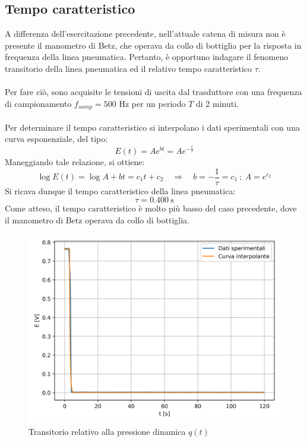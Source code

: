 \newpage
\subsection{Tempo caratteristico}
A differenza dell'esercitazione precedente, nell'attuale catena di misura non è presente il manometro di Betz, che operava da collo di bottiglia per la risposta in frequenza della linea pneumatica. Pertanto, è opportuno indagare il fenomeno transitorio della linea pneumatica ed il relativo tempo caratteristico $\tau$.\\\\
Per fare ciò, sono acquisite le tensioni di uscita dal trasduttore con una frequenza di campionamento $f_{samp}=500$ Hz per un periodo $T$ di 2 minuti.\\\\
Per determinare il tempo caratteristico si interpolano i dati sperimentali con una curva esponenziale, del tipo:
\begin{equation*}
    E(t) = Ae^{bt} = Ae^{-\frac t\tau}
\end{equation*}
Maneggiando tale relazione, si ottiene:
\begin{equation*}
    \log E(t) = \log A + bt = c_1 t + c_2 \quad \Rightarrow \quad b = -\frac1\tau = c_1 \ ; \ A = e^{c_2}
\end{equation*}
Si ricava dunque il tempo caratteristico della linea pneumatica:
\begin{equation*}
    \tau = 0.400\ \text{s}
\end{equation*}
Come atteso, il tempo caratteristico è molto più basso del caso precedente, dove il manometro di Betz operava da collo di bottiglia.
\begin{figure}[H]
    \centering
    \includegraphics[width=.7\textwidth]{images/2/transitorio.png}
    \caption{Transitorio relativo alla pressione dinamica $q(t)$}\label{fig:t2}
\end{figure}
